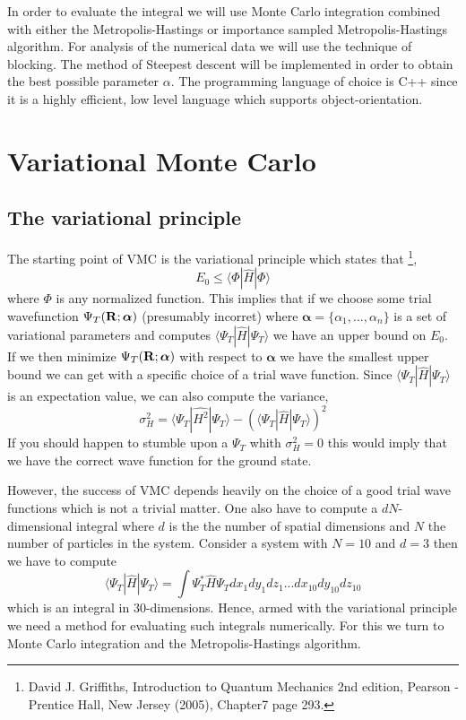 \documentclass[a4paper,10pt]{article}
\begin{document}
In order to evaluate the integral we will use Monte Carlo integration combined with either the Metropolis-Hastings or importance sampled Metropolis-Hastings algorithm. For analysis of the numerical data
we will use the technique of blocking. The method of Steepest descent will be implemented in order to obtain the best possible parameter $\alpha$. The programming language of choice is C++ since it is a highly efficient, low
level language which supports object-orientation. 



\section{Variational Monte Carlo}

\subsection{The variational principle}
The starting point of VMC is the variational principle which states that \footnote{David J. Griffiths, Introduction to Quantum Mechanics 2nd edition, Pearson - Prentice Hall,
New Jersey (2005), Chapter7 page 293.},
\begin{equation}
 E_0 \leq \langle \Phi | \hat{H} | \Phi \rangle
\end{equation}
where $\Phi$ is any normalized function. This implies that if we choose some trial wavefunction $\Psi_T({\bf R}; {\bm \alpha})$ (presumably incorret) where $ {\bm \alpha} = \{\alpha_1,...,\alpha_n\}$ 
is a set of variational parameters and computes $\langle \Psi_T | \hat{H} | \Psi_T \rangle$ we have an upper bound on $E_0$. If we then minimize
$\Psi_T({\bf R}; {\bm \alpha})$ with respect to ${\bm \alpha}$ we have the smallest upper bound we can get with a specific choice of a trial wave function.
Since $\langle \Psi_T | \hat{H} | \Psi_T \rangle$ is an expectation value, we can also compute the variance,
\begin{equation}
 \sigma_H^2 = \langle \Psi_T |\hat{H^2}| \Psi_T \rangle - (\langle \Psi_T |\hat{H}| \Psi_T \rangle)^2
\end{equation}
If you should happen to stumble upon a $\Psi_T$ whith $\sigma_H^2 = 0$ this would imply that we have the correct wave function for the ground state.

However, the success of VMC depends heavily on the choice of a good trial wave functions which is not a trivial matter. One also have to compute a $dN$-dimensional integral where 
$d$ is the the number of spatial dimensions and $N$ the number of particles in the system. Consider a system with $N=10$ and $d=3$ then we have to compute
\begin{equation}
 \langle \Psi_T |\hat{H}| \Psi_T \rangle = \int \Psi_T^* \hat{H} \Psi_T dx_1 dy_1 dz_1 ... dx_{10} dy_{10} dz_{10} 
\end{equation}
which is an integral in $30$-dimensions. Hence, armed with the variational principle we need a method for evaluating such integrals numerically. For this
we turn to Monte Carlo integration and the Metropolis-Hastings algorithm. 
\end{document}
